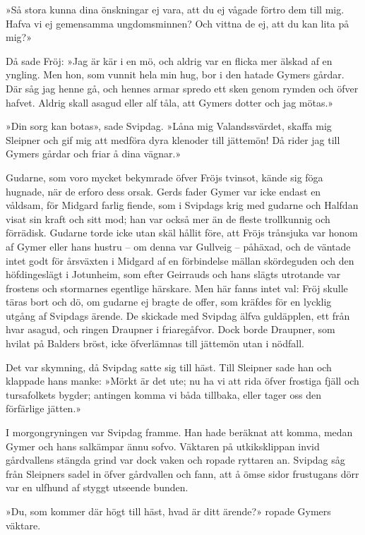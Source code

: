 »Så stora kunna dina önskningar ej vara, att du ej vågade förtro dem
till mig. Hafva vi ej gemensamma ungdomsminnen? Och vittna de ej, att du
kan lita på mig?»

Då sade Fröj: »Jag är kär i en mö, och aldrig var en flicka mer älskad
af en yngling. Men hon, som vunnit hela min hug, bor i den hatade Gymers
gårdar. Där såg jag henne gå, och hennes armar spredo ett sken genom
rymden och öfver hafvet. Aldrig skall asagud eller alf tåla, att Gymers
dotter och jag mötas.»

»Din sorg kan botas», sade Svipdag. »Låna mig Valandssvärdet, skaffa mig
Sleipner och gif mig att medföra dyra klenoder till jättemön! Då rider
jag till Gymers gårdar och friar å dina vägnar.»

Gudarne, som voro mycket bekymrade öfver Fröjs tvinsot, kände sig föga
hugnade, när de erforo dess orsak. Gerds fader Gymer var icke endast en
våldsam, för Midgard farlig fiende, som i Svipdags krig med gudarne och
Halfdan visat sin kraft och sitt mod; han var också mer än de fleste
trollkunnig och förrädisk. Gudarne torde icke utan skäl hållit före, att
Fröjs trånsjuka var honom af Gymer eller hans hustru -- om denna var
Gullveig -- påhäxad, och de väntade intet godt för årsväxten i Midgard
af en förbindelse mällan skördeguden och den höfdingeslägt i Jotunheim,
som
efter Geirrauds och hans slägts utrotande var frostens och stormarnes
egentlige härskare. Men här fanns intet val: Fröj skulle täras bort och
dö, om gudarne ej bragte de offer, som kräfdes för en lycklig utgång af
Svipdags ärende. De skickade med Svipdag älfva guldäpplen, ett från hvar
asagud, och ringen Draupner i friaregåfvor. Dock borde Draupner, som
hvilat på Balders bröst, icke öfverlämnas till jättemön utan i nödfall.

Det var skymning, då Svipdag satte sig till häst. Till Sleipner sade han
och klappade hans manke: »Mörkt är det ute; nu ha vi att rida öfver
frostiga fjäll och tursafolkets bygder; antingen komma vi båda tillbaka,
eller tager oss den förfärlige jätten.»

I morgongryningen var Svipdag framme. Han hade beräknat att komma, medan
Gymer och hans salkämpar ännu sofvo. Väktaren på utkiksklippan invid
gårdvallens stängda grind var dock vaken och ropade ryttaren an. Svipdag
såg från Sleipners sadel in öfver gårdvallen och fann, att å ömse sidor
frustugans dörr var en ulfhund af styggt utseende bunden.

»Du, som kommer där högt till häst, hvad är ditt ärende?» ropade Gymers
väktare.

